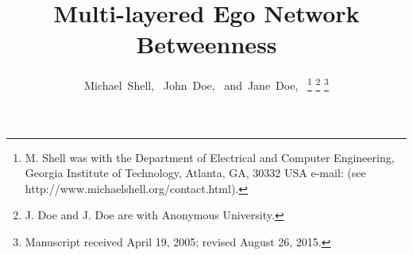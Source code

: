 \documentclass[journal]{IEEEtran}
\theoremstyle{definition}
\begin{document}
%
\title{Multi-layered Ego Network Betweenness}
%
%
%

\author{Michael~Shell,~
        John~Doe,~
        and~Jane~Doe,~%
\thanks{M. Shell was with the Department
of Electrical and Computer Engineering, Georgia Institute of Technology, Atlanta,
GA, 30332 USA e-mail: (see http://www.michaelshell.org/contact.html).}%
\thanks{J. Doe and J. Doe are with Anonymous University.}%
\thanks{Manuscript received April 19, 2005; revised August 26, 2015.}}

% 
%
\end{document}
